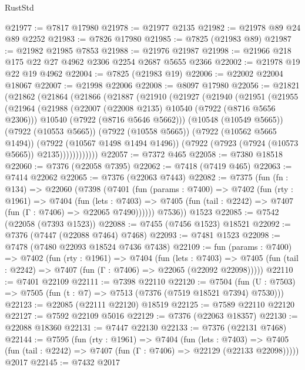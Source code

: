 \begin{lexlean}{RustStd}
\begin{coremodule}
@21977 := @7817 @17980
@21978 := @21977 @2135
@21982 := @21978 @89 @24 @89 @2252
@21983 := @7826 @17980
@21985 := @7825 (@21983 @89)
@21987 := @21982 @21985 @7853
@21988 := @21976 @21987
@21998 := @21966 @218 @175 @22 @27 @4962 @2306 @2254 @2687 @5655 @2366
@22002 := @21978 @19 @22 @19 @4962
@22004 := @7825 (@21983 @19)
@22006 := @22002 @22004 @18067
@22007 := @21998 @22006
@22008 := @8097 @17980
@22056 := @21821
    (@21862
      (@21864
        (@21866
          (@21887
            (@21910
              (@21927
                (@21940
                  (@21951
                    (@21955
                      (@21964
                        (@21988
                          (@22007 (@22008 @2135) @10540 (@7922 (@8716 @5656 @2306)))
                          @10540
                          (@7922 (@8716 @5646 @5662)))
                        (@10548 (@10549 @5665))
                        (@7922 (@10553 @5665))
                        (@7922 (@10558 @5665))
                        (@7922 (@10562 @5665 @1494))
                        (@7922 (@10567 @1498 @1494 @1496))
                        (@7922 (@7923 (@7924 (@10573 @5665)) @2135))))))))))))
@22057 := @7372 @465
@22058 := @7380 @18518
@22060 := @7376 (@22058 @7395)
@22062 := @7418 (@7419 @465)
@22063 := @7414 @22062
@22065 := @7376 (@22063 @7443)
@22082 := @7375
    (fun (fn : @134) =>
    @22060
      (@7398
        (@7401
          (fun (params : @7400) =>
          @7402
            (fun (rty : @1961) =>
            @7404
              (fun (lets : @7403) =>
              @7405 (fun (tail : @2242) => @7407 (fun (Γ : @7406) => @22065 @7490))))))
        @7536))
    @1523
@22085 := @7542 (@22058 (@7393 @1523))
@22088 := @7455 (@7456 @1523) @18521
@22092 := @7376 (@7447 (@22088 @7464) @7468)
@22093 := @7481 @1523
@22098 := @7478 (@7480 @22093 @18524 @7436 @7438)
@22109 := fun (params : @7400) =>
  @7402
    (fun (rty : @1961) =>
    @7404
      (fun (lets : @7403) =>
      @7405 (fun (tail : @2242) => @7407 (fun (Γ : @7406) => @22065 (@22092 @22098)))))
@22110 := @7401 @22109
@22111 := @7398 @22110
@22120 := @7504
    (fun (U : @7503) => @7505 (fun (t : @7) => @7513 (@7376 (@7519 @18521 @7394) @7530)))
@22123 := @22085 (@22111 @22120) @18519
@22125 := @7589 @22110 @22120
@22127 := @7592 @22109 @5016
@22129 := @7376 (@22063 @18357)
@22130 := @22088 @18360
@22131 := @7447 @22130
@22133 := @7376 (@22131 @7468)
@22144 := @7595
    (fun (rty : @1961) =>
    @7404
      (fun (lets : @7403) =>
      @7405 (fun (tail : @2242) => @7407 (fun (Γ : @7406) => @22129 (@22133 @22098)))))
    @2017
@22145 := @7432 @2017

\end{coremodule}
\end{lexlean}
